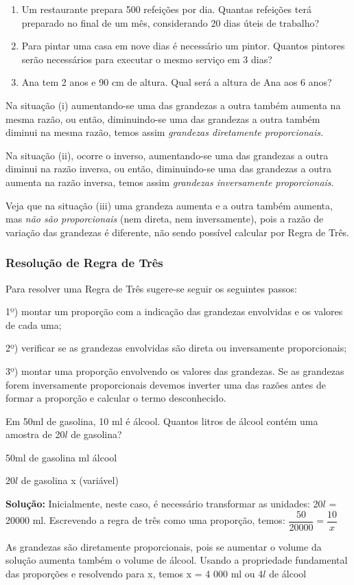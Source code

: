 \begin{enumerate}[label=(\roman*)]
	\item Um restaurante prepara 500 refeições por dia. Quantas refeições terá preparado no final de um mês, considerando 20 dias úteis de trabalho?

	\item Para pintar uma casa em nove dias é necessário um pintor. Quantos pintores serão necessários para executar o mesmo serviço em 3 dias?

	\item  Ana tem 2 anos e 90 cm de altura. Qual será a altura de Ana aos 6 anos?
\end{enumerate}

Na situação (i) aumentando-se uma das grandezas a outra também aumenta na mesma razão, ou então, diminuindo-se uma das grandezas a outra também diminui na mesma razão, temos assim \textit{grandezas diretamente proporcionais.}

Na situação (ii), ocorre o inverso, aumentando-se uma das grandezas a outra diminui na razão inversa, ou então, diminuindo-se uma das grandezas a outra aumenta na razão inversa, temos assim \textit{grandezas inversamente proporcionais}.

Veja que na situação (iii) uma grandeza aumenta e a outra também aumenta, mas \textit{não são proporcionais} (nem direta, nem inversamente), pois a razão de variação das grandezas é diferente, não sendo possível calcular por Regra de Três.

\subsubsection{Resolução de Regra de Três}
	Para resolver uma Regra de Três sugere-se seguir os seguintes passos:

1º) montar um proporção com a indicação das grandezas envolvidas e os valores de cada uma;

2º) verificar se as grandezas envolvidas são direta ou inversamente proporcionais;

3º) montar uma proporção envolvendo os valores das grandezas. Se as grandezas forem inversamente proporcionais devemos inverter uma das razões antes de formar a proporção e calcular o termo desconhecido.

\begin{texemplo}
Em  50ml de gasolina, 10 ml é álcool. Quantos litros de álcool contém uma amostra de  20$l$ de gasolina?

50ml de gasolina \quad \quad \quad {} ml álcool

20$l$ de gasolina \quad \quad \quad \quad x (variável)

\textbf{Solução:} Inicialmente, neste caso, é necessário transformar as unidades: 20$l$ = 20000 ml. Escrevendo a regra de três como uma proporção, temos:
$\dfrac{50}{20000}=\dfrac{10}{x}$ 

As grandezas são diretamente proporcionais, pois se aumentar o volume da solução aumenta também o volume de álcool. 
Usando a propriedade fundamental das proporções e resolvendo para x, temos x = 4 000 ml  ou 4$l$  de álcool \qedsymbol{}
\end{texemplo}

